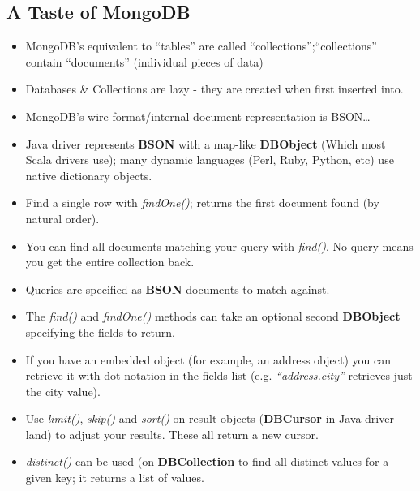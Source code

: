 \documentclass{beamer}
\newenvironment{itemizeframe}
               {\begin{frame}\startitemizeframe} 
               {\stopitemizeframe\end{frame}}
\newenvironment{itemizecodeframe}
              {\begin{frame}[allowframebreaks,allowdisplaybreaks]
              \startitemizeframe} 
              {\stopitemizeframe\end{frame}}
\newcommand\startitemizeframe{\begin{itemize}} \newcommand\stopitemizeframe{\end{itemize}}
\begin{document}
\begin{itemizeframe}
\subsection{A Taste of MongoDB}
\begin{itemizeframe}
    \frametitle{Core Concepts}
    \item MongoDB's equivalent to ``tables'' are called ``collections'';``collections'' contain ``documents'' (individual pieces of data)
    \item Databases \& Collections are lazy - they are created when first inserted into.
    \item MongoDB's wire format/internal document representation is BSON\ldots
    \item {\scriptsize Java driver represents {\bf BSON} with a map-like {\bf DBObject} (Which most Scala drivers use); many dynamic languages (Perl, Ruby, Python, etc) use native dictionary objects. }
\end{itemizeframe}



\begin{itemizecodeframe}
\frametitle{The basics of Querying}
    \item Find a single row with \emph{findOne()}; returns the first document found (by natural order).  
    \item You can find all documents matching your query with \emph{find()}.  No query means you get the entire collection back.
    \item Queries are specified as {\bf BSON} documents to match against.
    \item The \emph{find()} and \emph{findOne()} methods can take an optional second {\bf DBObject} specifying the fields to return.
    \item If you have an embedded object (for example, an address object) you can retrieve it with dot notation in the fields list (e.g. {\em ``address.city''} retrieves just the city value).
    \item Use {\em limit()}, {\em skip()} and {\em sort()} on result objects ({\bf DBCursor} in Java-driver land) to adjust your results.  These all return a new cursor.  
    \item {\em distinct()} can be used (on {\bf DBCollection} to find all distinct values for a given key; it returns a list of values.

\end{itemizecodeframe}


\end{itemizeframe}
\end{document}
